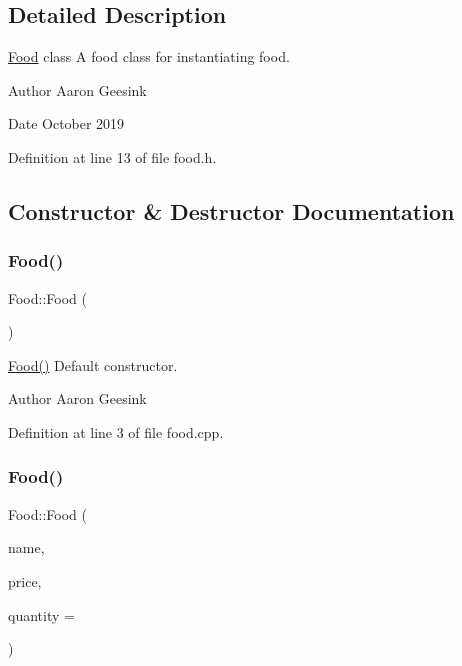 \subsection{Detailed Description}
\mbox{\hyperlink{class_food}{Food}} class A food class for instantiating food. 

\begin{DoxyAuthor}{Author}
Aaron Geesink 
\end{DoxyAuthor}
\begin{DoxyDate}{Date}
October 2019 
\end{DoxyDate}


Definition at line 13 of file food.\+h.



\subsection{Constructor \& Destructor Documentation}
\mbox{\label{class_food_a75d4d7f76fd495cc8133302ca9fdc485}} 
\subsubsection{\texorpdfstring{Food()}{Food()}\hspace{0.1cm}{\footnotesize\ttfamily [1/4]}}
{\footnotesize\ttfamily Food\+::\+Food (\begin{DoxyParamCaption}{ }\end{DoxyParamCaption})}



\mbox{\hyperlink{class_food_a75d4d7f76fd495cc8133302ca9fdc485}{Food()}} Default constructor. 

\begin{DoxyAuthor}{Author}
Aaron Geesink 
\end{DoxyAuthor}


Definition at line 3 of file food.\+cpp.

\mbox{\label{class_food_aa479389d71859831d48d21bae7fa5217}} 
\subsubsection{\texorpdfstring{Food()}{Food()}\hspace{0.1cm}{\footnotesize\ttfamily [2/4]}}
{\footnotesize\ttfamily Food\+::\+Food (\begin{DoxyParamCaption}\item[{Q\+String}]{name,  }\item[{double}]{price,  }\item[{int}]{quantity = {} }\end{DoxyParamCaption})}



